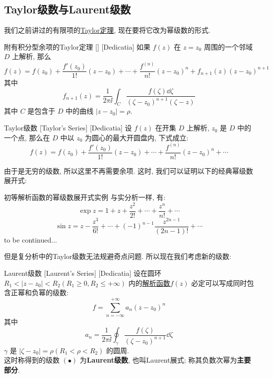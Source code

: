 \documentclass[UTF8]{ctexart}
\newcommand{\continued}{{\Large to be continued...}}
\newcommand{\AnalyticalFunction}{\hyperref[dfn:AnalyticalFunction]{解析函数}}
\newcommand{\TaylorThm}{\hyperref[thm:Taylor]{Taylor定理}}
\begin{document}
\subsection{Taylor级数与Laurent级数}
我们之前讲过的有限项的\TaylorThm, 现在要将它改为幂级数的形式. 
\begin{thm}
    [UUID]
    {附有积分型余项的Taylor定理}
    []
    [Dedicatia]
    如果 \( f(z) \) 在 \( z=z_0 \) 周围的一个邻域 \( D \) 上解析, 那么
    \[f(z)=f(z_0)+\frac{f'(z_0)}{1!}(z-z_0)+\cdots+\frac{f^{(n)}}{n!}(z-z_0)^n+f_{n+1}(z)(z-z_0)^{n+1}\]
    其中
    \[f_{n+1}(z)=\frac{1}{2\pi\ii}\int_C\frac{f(\zeta)\dd{\zeta}}{(\zeta-z_0)^{n+1}(\zeta-z)}\]
    其中 \( C \) 是包含于 \( D \) 中的曲线 \( |z-z_0|=\rho \). 
\end{thm}
\begin{thm}
    [TaylorSeries]
    {Taylor级数}
    [Taylor's Series]
    [Dedicatia]
    设 \( f(z) \) 在开集 \( D \) 上解析,  \( z_0 \) 是 \( D \) 中的一个点, 那么在 \( D \) 中以 \( z_0 \) 为圆心的最大开圆盘内, 下式成立: 
    \[f(z)=f(z_0)+\frac{f'(z_0)}{1!}(z-z_0)+\cdots+\frac{f^{(n)}}{n!}(z-z_0)^n+\cdots\]
\end{thm}
由于是无穷的级数, 所以这里不再需要余项. 这时, 我们可以证明以下的经典幂级数展开式: 
\begin{xmp}
    {初等解析函数的幂级数展开式实例\label{xmp:TaylorCommon}}
    与实分析一样, 有: 
    \[\exp z=1+z+\frac{z^2}{2!}+\cdots+\frac{z^n}{n!}+\cdots\]
    \[\sin z=z-\frac{z^3}{6!}+\cdots+(-1)^{n-1}\frac{z^{2n-1}}{(2n-1)!}+\cdots\]
    \continued
\end{xmp}
但是复分析中的Taylor级数无法规避奇点问题. 所以现在我们考虑新的级数: 
\begin{thm}
    [Laurent]
    {Laurent级数}
    [Laurent's Series]
    [Dedicatia]
    设在圆环 \( R_1<|z-z_0|<R_2(R_1\geqslant 0, R_2\leqslant+\infty ) \) 内的\AnalyticalFunction  \( f(z) \) 必定可以写成同时包含正幂和负幂的级数: 
    \[f=\sum_{n=-\infty}^{+\infty}a_n(z-z_0)^n\tag{ \( \bullet \) }\]
    其中
    \[a_n=\frac{1}{2\pi\ii}\oint_{\gamma}\frac{f(\zeta)}{(\zeta-z_0)^{n+1}}\dd{\zeta}\]
    \( \gamma \) 是 \( |\zeta-z_0|=\rho(R_1<\rho< R_2) \) 的圆周. \\
    这时称得到的级数 \( (\bullet) \) 为\textbf{Laurent级数}, 也叫Laurent展式; 称其负数次幂为\textbf{主要部分}. 
\end{thm}
\end{document}
